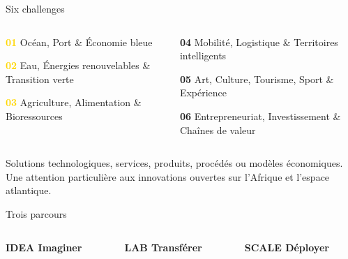 \documentclass[aspectratio=169,11pt]{beamer}
\newcommand{\card}[2]{%
  \colorbox{cream2}{\parbox[t]{0.94\linewidth}{{\sffamily\scriptsize\bfseries\color{gold}#1}\par\vspace{1mm}{\small #2}}}%
}
\begin{document}
\begin{frame}{Six challenges}
  \small
  \begin{columns}[T]
    \begin{column}{0.48\textwidth}
      \textbf{\textcolor{gold}{01}} Oc\'ean, Port \& \'Economie bleue\par
      \textbf{\textcolor{gold}{02}} Eau, \'Energies renouvelables \& Transition verte\par
      \textbf{\textcolor{gold}{03}} Agriculture, Alimentation \& Bioressources\par
    \end{column}
    \begin{column}{0.48\textwidth}
      \textbf{\textcolor{redm}{04}} Mobilit\'e, Logistique \& Territoires intelligents\par
      \textbf{\textcolor{redm}{05}} Art, Culture, Tourisme, Sport \& Exp\'erience\par
      \textbf{\textcolor{redm}{06}} Entrepreneuriat, Investissement \& Cha\^ines de valeur\par
    \end{column}
  \end{columns}
  \vspace{3mm}
  {\footnotesize\color{muted} Solutions technologiques, services, produits, proc\'ed\'es ou mod\`eles \'economiques. Une attention particuli\`ere aux innovations ouvertes sur l'Afrique et l'espace atlantique.}
\end{frame}

\begin{frame}{Trois parcours}
  \begin{columns}[T]
    \begin{column}{0.32\textwidth}\card{IDEA \enspace Imaginer}{\'Etudiants et porteurs d'id\'ees. Du concept \`a une premi\`ere preuve : prototype, maquette, MVP ou mod\`ele \'economique.}\end{column}
    \begin{column}{0.32\textwidth}\card{LAB \enspace Transf\'erer}{Chercheurs. D'un r\'esultat scientifique vers le territoire : maturation, propri\'et\'e intellectuelle, TRL/CRL.}\end{column}
    \begin{column}{0.32\textwidth}\card{SCALE \enspace D\'eployer}{Startups. Une solution d\'ej\`a avanc\'ee \`a adapter, exp\'erimenter et d\'eployer dans les Provinces du Sud.}\end{column}
  \end{columns}
\end{frame}
\end{document}
